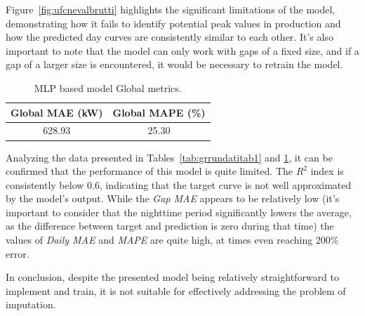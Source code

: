 Figure~\ref{fig:ufcnevalbrutti} highlights the significant limitations
of the model, demonstrating how it fails to identify potential peak
values in production and how the predicted day curves are consistently similar
to each other.
It's also important to note that the model can only work with
gaps of a fixed size, and if a gap of a larger size is encountered,
it would be necessary to retrain the model.



\begin{table}[H]
	\centering
	\begin{tabular}{c|c}
		\multicolumn{1}{c|}{\textbf{Global MAE (kW)}} &
		\multicolumn{1}{c}{\textbf{Global MAPE (\%)}}         \\
		\hline
		628.93                                        & 25.30 \\
	\end{tabular}
	\caption{MLP based model Global metrics.}
	\label{tab:globalmetrics}
\end{table}

Analyzing the data presented in Tables~\ref{tab:grrundatitab1}
and \ref{tab:globalmetrics}, it can be confirmed that the performance
of this model is quite limited.
The $R^2$ index is consistently below 0.6, indicating that the target
curve is not well approximated by the model's output.
While the \textit{Gap MAE} appears to be relatively low (it's
important to consider that the nighttime period significantly lowers
the average, as the difference between target and prediction is zero during that time) the values of \textit{Daily MAE} and \textit{MAPE} are quite high, at times even reaching 200\% error.

In conclusion, despite the presented model being relatively
straightforward to implement and train, it is not suitable for
effectively addressing the problem of imputation.

